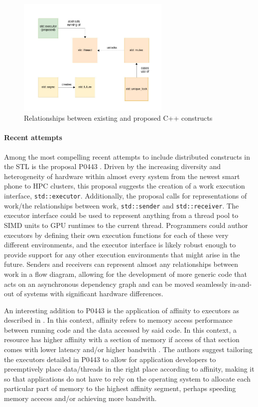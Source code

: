 \begin{figure}[h]
\centering
\includegraphics[width=0.65\textwidth]{Figures/cpp_firstclass.jpg}
\caption{Relationships between existing and proposed C++ constructs}
\label{fig:cpp_firstclass}
\end{figure}

\paragraph{Recent attempts}
Among the most compelling recent attempts to include distributed constructs in the STL is the proposal P0443 \cite{p0443}. Driven by the increasing diversity and heterogeneity of hardware within almost every system from the newest smart phone to HPC clusters, this proposal suggests the creation of a work execution interface, \texttt{std::executor}. Additionally, the proposal calls for representations of work/the relationships between work, \texttt{std::sender} and \texttt{std::receiver}. The executor interface could be used to represent anything from a thread pool to SIMD units to GPU runtimes to the current thread. Programmers could author executors by defining their own execution functions for each of these very different environments, and the executor interface is likely robust enough to provide support for any other execution environments that might arise in the future. Senders and receivers can represent almost any relationships between work in a flow diagram, allowing for the development of more generic code that acts on an asynchronous dependency graph and can be moved seamlessly in-and-out of systems with significant hardware differences. 

An interesting addition to P0443 is the application of affinity to executors as described in \cite{towards_dist_cpp}. In this context, affinity refers to memory access performance between running code and the data accessed by said code. In this context, a resource has higher affinity with a section of memory if access of that section comes with lower latency and/or higher bandwith \cite{towards_dist_cpp}. The authors suggest tailoring the executors detailed in P0443 to allow for application developers to preemptively place data/threads in the right place according to affinity, making it so that applications do not have to rely on the operating system to allocate each particular part of memory to the highest affinity segment, perhaps speeding memory accecss and/or achieving more bandwith. 

